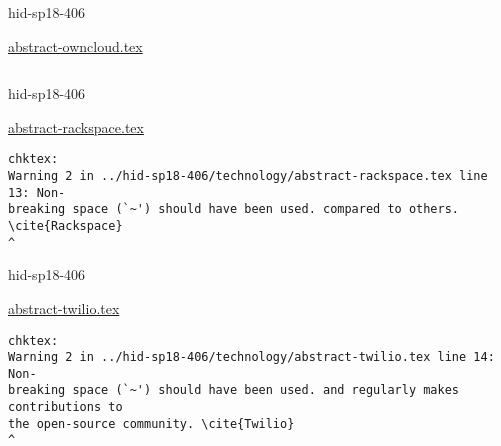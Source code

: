 

\begin{IU}

hid-sp18-406

\href{https://github.com/cloudmesh-community/hid-sp18-406/blob/master//technology/abstract-owncloud.tex}{abstract-owncloud.tex}

\begin{tiny}
\begin{verbatim}
\end{verbatim}
\end{tiny}
\end{IU}



\begin{IU}

hid-sp18-406

\href{https://github.com/cloudmesh-community/hid-sp18-406/blob/master//technology/abstract-rackspace.tex}{abstract-rackspace.tex}

\begin{tiny}
\begin{verbatim}
chktex:
Warning 2 in ../hid-sp18-406/technology/abstract-rackspace.tex line 13: Non-
breaking space (`~') should have been used. compared to others. \cite{Rackspace}
^
\end{verbatim}
\end{tiny}
\end{IU}



\begin{IU}

hid-sp18-406

\href{https://github.com/cloudmesh-community/hid-sp18-406/blob/master//technology/abstract-twilio.tex}{abstract-twilio.tex}

\begin{tiny}
\begin{verbatim}
chktex:
Warning 2 in ../hid-sp18-406/technology/abstract-twilio.tex line 14: Non-
breaking space (`~') should have been used. and regularly makes contributions to
the open-source community. \cite{Twilio}
^
\end{verbatim}
\end{tiny}
\end{IU}




